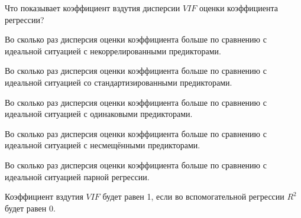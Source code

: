 
\begin{question}
Что показывает коэффициент вздутия дисперсии \(VIF\) оценки коэффициента регрессии?
\begin{answerlist}
  \item Во сколько раз дисперсия оценки коэффициента больше по сравнению с идеальной ситуацией с некоррелированными предикторами.
  \item Во сколько раз дисперсия оценки коэффициента больше по сравнению с идеальной ситуацией со стандартизированными предикторами.
  \item Во сколько раз дисперсия оценки коэффициента больше по сравнению с идеальной ситуацией с одинаковыми предикторами.
  \item Во сколько раз дисперсия оценки коэффициента больше по сравнению с идеальной ситуацией с несмещёнными предикторами.
  \item Во сколько раз дисперсия оценки коэффициента больше по сравнению с идеальной ситуацией парной регрессии.
\end{answerlist}
\end{question}

\begin{solution}
Коэффициент вздутия \(VIF\) будет равен 1, если во вспомогательной регрессии \(R^2\) будет равен 0.
\end{solution}

